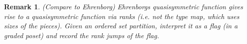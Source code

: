\documentclass[12pt,reqno]{amsart}
\numberwithin{definition}{section}
\newtheorem{remark}[definition]{Remark}
\begin{document}




\begin{remark}
(Compare to Ehrenborg)
Ehrenborgs quasisymmetric function gives rise to a quasisymmetric function via ranks (i.e. not the type map, which uses sizes of the pieces).  Given an ordered set partition, interpret it as a flag (in a graded poset) and record the rank jumps of the flag.  





\end{remark}








\end{document}
